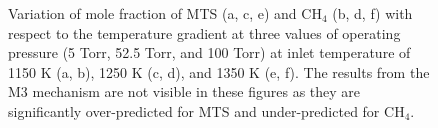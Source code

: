 \documentclass[final, letterpaper, square, comma, numbers, sort&compress]{elsarticle}
\begin{document}
\begin{figure}
    \caption{Variation of mole fraction of MTS (a, c, e) and CH$_4$ (b, d, f) with respect to the temperature gradient at three values of operating pressure (5 Torr, 52.5 Torr, and 100 Torr) at inlet temperature of 1150 K (a, b), 1250 K (c, d), and 1350 K (e, f). The results from the M3 mechanism are not visible in these figures as they are significantly over-predicted for MTS and under-predicted for CH$_4$.}
    \label{fig:8}
\end{figure}
\end{document}
